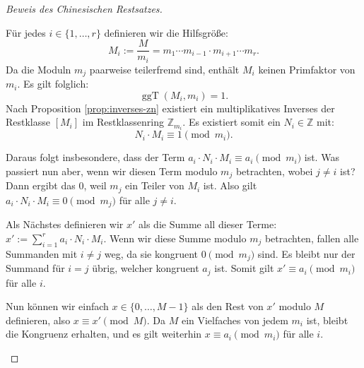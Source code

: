 \begin{proof}[Beweis des Chinesischen Restsatzes]
\begin{math-stroke}
Für jedes $i \in \{1, \dots, r\}$ definieren wir die Hilfsgröße:
\begin{equation}\label{eq:def-mi-groß}
M_i := \frac{M}{m_i} = m_1 \cdots m_{i-1} \cdot m_{i+1} \cdots m_r.
\end{equation}
Da die Moduln $m_j$ paarweise teilerfremd sind, enthält $M_i$ keinen Primfaktor von $m_i$. Es gilt folglich:
\[
\operatorname{ggT}(M_i, m_i) = 1.
\]
Nach Proposition \ref{prop:inverses-zn} existiert ein multiplikatives Inverses der Restklasse $[M_i]$ im Restklassenring $\mathbb{Z}_{m_i}$. Es existiert somit ein $N_i \in \mathbb{Z}$ mit:
\begin{equation}\label{eq:inverse-mi-bezout}
N_i \cdot M_i \equiv 1 \pmod{m_i}.
\end{equation}
\end{math-stroke}

\begin{spoken-clean}[01:08:53 - 01:12:39]
Daraus folgt insbesondere, dass der Term $a_i \cdot N_i \cdot M_i \equiv a_i \pmod{m_i}$ ist. Was passiert nun aber, wenn wir diesen Term modulo $m_j$ betrachten, wobei $j \neq i$ ist? Dann ergibt das $0$, weil $m_j$ ein Teiler von $M_i$ ist. Also gilt $a_i \cdot N_i \cdot M_i \equiv 0 \pmod{m_j}$ für alle $j \neq i$.

Als Nächstes definieren wir $x'$ als die Summe all dieser Terme: $x' := \sum_{i=1}^r a_i \cdot N_i \cdot M_i$. Wenn wir diese Summe modulo $m_j$ betrachten, fallen alle Summanden mit $i \neq j$ weg, da sie kongruent $0 \pmod{m_j}$ sind. Es bleibt nur der Summand für $i = j$ übrig, welcher kongruent $a_j$ ist. Somit gilt $x' \equiv a_i \pmod{m_i}$ für alle $i$.

Nun können wir einfach $x \in \{0, \dots, M-1\}$ als den Rest von $x'$ modulo $M$ definieren, also $x \equiv x' \pmod M$. Da $M$ ein Vielfaches von jedem $m_i$ ist, bleibt die Kongruenz erhalten, und es gilt weiterhin $x \equiv a_i \pmod{m_i}$ für alle $i$.
\end{spoken-clean}


\end{proof}
